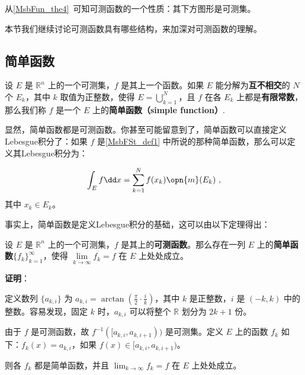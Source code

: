 

从\autoref{MsbFun_the4}~可知可测函数的一个性质：其下方图形是可测集。

本节我们继续讨论可测函数具有哪些结构，来加深对可测函数的理解。

\subsection{简单函数}

\begin{definition}{}\label{MsbFSt_def1}
设 $E$ 是 $\mathbb{R}^n$ 上的一个可测集，$f$ 是其上一个函数。如果 $E$ 能分解为\textbf{互不相交}的 $N$ 个 $E_k$，其中 $k$ 取值为正整数，使得 $E=\bigcup_{k=1}^N$，且 $f$ 在各 $E_k$ 上都是\textbf{有限常数}，那么我们称 $f$ 是一个 $E$ 上的\textbf{简单函数（simple function）}.
\end{definition}

显然，简单函数都是可测函数。你甚至可能留意到了，简单函数可以直接定义Lebesgue积分了：如果 $f$ 是\autoref{MsbFSt_def1} 中所说的那种简单函数，那么可以定义其Lebesgue积分为：

\begin{equation}\label{MsbFSt_eq1}
\int_E f \dd x = \sum_{k=1}^N f(x_k) \opn{m}(E_k)~,
\end{equation}
其中 $x_k\in E_k$。

事实上，简单函数是定义Lebesgue积分的基础，这可以由以下定理得出：

\begin{theorem}{}\label{MsbFSt_the1}
设 $E$ 是 $\mathbb{R}^n$ 上的一个可测集，$f$ 是其上的\textbf{可测函数}。那么存在一列 $E$ 上的\textbf{简单函数}$\{f_k\}_{k=1}^\infty$，使得 $\lim\limits_{k\to\infty}f_k=f$ 在 $E$ 上处处成立。
\end{theorem}

\textbf{证明}：

定义数列 $\{a_{k, i}\}$ 为 $a_{k, i}=\arctan(\frac{\pi}{2}\cdot\frac{i}{k})$，其中 $k$ 是正整数，$i$ 是 $(-k, k)$ 中的整数。容易发现，固定 $k$ 时，$a_{k, i}$ 可以将整个 $\mathbb{R}$ 划分为 $2k+1$ 份。

由于 $f$ 是可测函数，故 $f^{-1}([a_{k, i}, a_{k, i+1}))$ 是可测集。定义 $E$ 上的函数 $f_k$ 如下：$f_k(x)=a_{k, i}$，如果 $f(x)\in [a_{k, i}, a_{k, i+1})$。

则各 $f_k$ 都是简单函数，并且 $\lim_{k\to\infty}f_k=f$ 在 $E$ 上处处成立。

